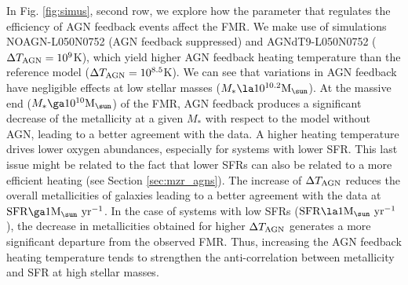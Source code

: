 \documentclass[useAMS,usenatbib]{mn2e}
\begin{document}
In Fig. \ref{fig:simus}, second row, we explore how the parameter that regulates the
efficiency of AGN feedback events
affect the FMR.  
We make use of simulations NOAGN-L050N0752 (AGN feedback suppressed) and AGNdT9-L050N0752 ($\Delta T_{\rm AGN} = 10^9$K),
which yield higher AGN feedback heating temperature than the reference model ($\Delta T_{\rm AGN} = 10^{8.5}$K). 
We can see that variations in AGN feedback
have negligible effects at low stellar masses ($M_* \la 10^{10.2} {\rm M}_{\sun}$).  
At the
massive end ($M_* \ga 10^{10} {\rm M}_{\sun}$) of the FMR, AGN feedback produces a significant
decrease of the metallicity at a given $M_*$ with respect to the model without AGN, leading
to a better agreement with the data.
A higher heating temperature
drives lower oxygen abundances, especially for systems with lower SFR.  
This last issue might be related to the fact that lower
SFRs can also be related to a more efficient heating (see Section \ref{sec:mzr_agns}). 
The increase of $\Delta T_{\rm AGN}$
reduces the overall metallicities of galaxies leading to a better agreement with the 
data at ${\rm SFR} \ga 1 {\rm M}_{\sun} \ {\rm yr}^{-1}$. In the case of systems with low
SFRs (${\rm SFR} \la 1 {\rm M}_{\sun} \ {\rm yr}^{-1}$),  the decrease in metallicities obtained
for higher $\Delta T_{\rm AGN}$ generates a more significant departure from the observed FMR.  
Thus, increasing the AGN feedback heating temperature tends to strengthen the anti-correlation 
between metallicity and SFR at high stellar masses.
\end{document}
